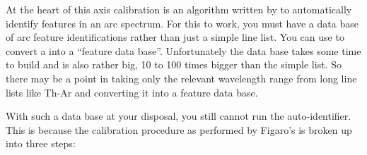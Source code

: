    At the heart of this axis calibration is an algorithm written by
   to automatically identify features in an arc spectrum.  For this to
   work, you must have a data base of arc feature identifications rather
   than just a simple line list.  You can use
{\tt{}}
   to convert a
   into a ``feature data base''.  Unfortunately the data base takes some
   time to build and is also rather big, 10 to 100 times bigger than
   the simple list.  So there may be a point in taking only the relevant
   wavelength range from long line lists like Th-Ar and converting it into
   a feature data base.

   With such a data base at your disposal, you still cannot run the
   auto-identifier.  This is because the calibration procedure as
   performed by Figaro's
{\tt{}}
   is broken up into three steps:

